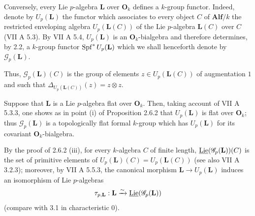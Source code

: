 Conversely, every Lie $p$-algebra $\mathbf L$ over $\mathbf O_k$ defines a $k$-group functor. Indeed, denote by $U_p(\mathbf L)$ the functor which associates to every object $C$ of $\mathbf{Alf}/k$ the restricted enveloping algebra $U_p(\mathbf L(C))$ of the Lie $p$-algebra $\mathbf L(C)$ over $C$ (VII A 5.3). By VII A 5.4, $U_p(\mathbf L)$ is an $\mathbf O_k$-bialgebra and therefore determines, by 2.2, a $k$-group functor $\operatorname{Spf}^*U_p(\mathbf L)$ which we shall henceforth denote by $\mathscr G_p(\mathbf L)$.

Thus, $\mathscr G_p(\mathbf L)(C)$ is the group of elements $z\in U_p(\mathbf L(C))$ of augmentation $1$ and such that $\Delta_{U_p(\mathbf L(C))}(z)=z\otimes z$.

Suppose that $\mathbf L$ is a Lie $p$-algebra flat over $\mathbf O_k$. Then, taking account of VII A 5.3.3, one shows as in point (i) of Proposition 2.6.2 that $U_p(\mathbf L)$ is flat over $\mathbf O_k$; thus $\mathscr G_p(\mathbf L)$ is a topologically flat formal $k$-group which has $U_p(\mathbf L)$ for its covariant $\mathbf O_k$-bialgebra.

By the proof of 2.6.2 (iii), for every $k$-algebra $C$ of finite length, $\underline{\operatorname{Lie}}(\mathscr G_p(\mathbf L))(C)$ is the set of primitive elements of $U_p(\mathbf L)(C)=U_p(\mathbf L(C))$ (see also VII A 3.2.3); moreover, by VII A 5.5.3, the canonical morphism $\mathbf L\to U_p(\mathbf L)$ induces an isomorphism of Lie $p$-algebras
\[
\tau_{p,\mathbf L}:\mathbf L\xrightarrow{\sim}\underline{\operatorname{Lie}}(\mathscr G_p(\mathbf L))
\]
(compare with 3.1 in characteristic $0$).

